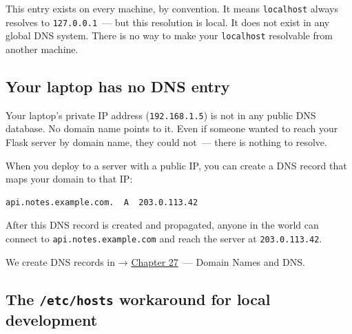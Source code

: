 \begin{codebox}[short]

\begin{Shaded}
\begin{Highlighting}[]
\end{Highlighting}
\end{Shaded}

\end{codebox}

\noindent{}This entry exists on every machine, by convention. It means \texttt{localhost} always resolves to \texttt{127.0.0.1}~--- but this resolution is local. It does not exist in any global DNS system. There is no way to make your \texttt{localhost} resolvable from another machine.

\subsection*{Your laptop has no DNS entry}\label{10-networking-limitations:your-laptop-has-no-dns-entry}

Your laptop's private IP address (\texttt{192.168.1.5}) is not in any public DNS database. No domain name points to it. Even if someone wanted to reach your Flask server by domain name, they could not~--- there is nothing to resolve.

When you deploy to a server with a public IP, you can create a DNS record that maps your domain to that IP:

\begin{outputbox}[short]
\begin{Verbatim}[fontsize=\codesize, breaklines, breakanywhere, breaksymbolleft={\tiny\textcolor{muted}{$\hookrightarrow$}}]
api.notes.example.com.  A  203.0.113.42
\end{Verbatim}
\end{outputbox}

\noindent{}After this DNS record is created and propagated, anyone in the world can connect to \texttt{api.notes.example.com} and reach the server at \texttt{203.0.113.42}.

We create DNS records in → \hyperref[ch:27-domain-and-dns]{Chapter 27}~--- Domain Names and DNS.

\subsection*{\texorpdfstring{The \texttt{/etc/hosts} workaround for local development}{The /etc/hosts workaround for local development}}\label{10-networking-limitations:the-etchosts-workaround-for-local-development}

